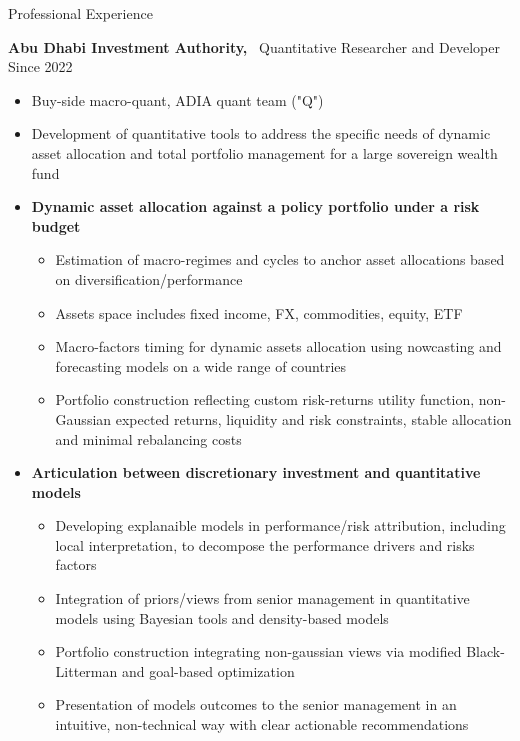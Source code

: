 \documentclass[usegeometry, 10pt, a4paper]{cv} %
\newcommand{\activite}[1]{\textbf{#1}\ }
\begin{document}
\vspace{0.2cm}


\begin{rubriquetableau}[0.95\textwidth]{Professional Experience}\\
\vspace{-0.7cm}

\activite{Abu  Dhabi   Investment  Authority,}  Quantitative   Researcher  and
Developer \hfill Since 2022 \\ \vspace{-0.7cm}
\begin{itemize}[label={},
rightmargin=\dimexpr\linewidth-13cm-\leftmargin\relax]
\item Buy-side macro-quant, ADIA quant team ("Q")
\item Development of  quantitative tools to address the specific  needs of dynamic asset allocation and total portfolio management for a large sovereign wealth fund

\item \textbf{Dynamic asset allocation against a policy portfolio under a risk budget}
  \begin{itemize}
  \item Estimation of macro-regimes and cycles to anchor asset allocations based on diversification/performance
  \item Assets space includes fixed income, FX, commodities, equity, ETF
  \item Macro-factors timing for dynamic assets allocation using nowcasting and forecasting models on a wide range of countries
  \item Portfolio construction reflecting custom risk-returns utility function, non-Gaussian expected returns, liquidity and risk constraints, stable allocation and minimal rebalancing costs
  \end{itemize}

\item \textbf{Articulation between discretionary investment and quantitative models}
  \begin{itemize}
  \item Developing explanaible models in performance/risk attribution, including local interpretation, to decompose the performance drivers and risks factors
  \item Integration of priors/views from senior management in quantitative models using Bayesian tools and density-based models
  \item Portfolio construction integrating non-gaussian views via modified Black-Litterman and goal-based optimization
  \item Presentation of models outcomes to the senior management in an intuitive, non-technical way with clear actionable recommendations
  \end{itemize}
    

\end{itemize}
\end{rubriquetableau}
\end{document}
